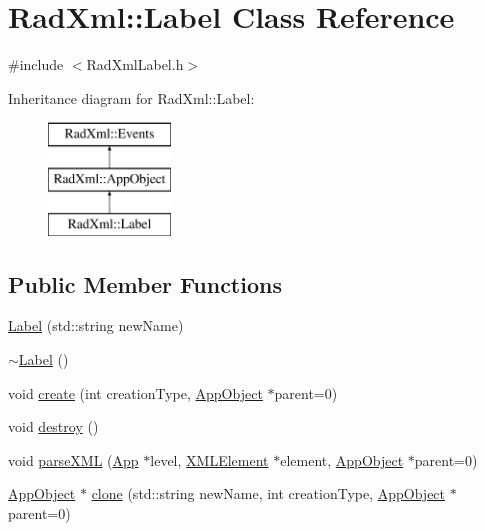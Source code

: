 \hypertarget{class_rad_xml_1_1_label}{\section{Rad\-Xml\-:\-:Label Class Reference}
\label{class_rad_xml_1_1_label}
}


{\ttfamily \#include $<$Rad\-Xml\-Label.\-h$>$}

Inheritance diagram for Rad\-Xml\-:\-:Label\-:\begin{figure}[H]
\begin{center}
\leavevmode
\includegraphics[height=3.000000cm]{class_rad_xml_1_1_label}
\end{center}
\end{figure}
\subsection*{Public Member Functions}
\begin{DoxyCompactItemize}
\item 
\hyperlink{class_rad_xml_1_1_label_a0a0cf0ef464a6b1089714e2ff40819d3}{Label} (std\-::string new\-Name)
\item 
\hyperlink{class_rad_xml_1_1_label_a7fffe35f7affdd1d7d9d77be0ca016fc}{$\sim$\-Label} ()
\item 
void \hyperlink{class_rad_xml_1_1_label_a8859aa4061b768cd27289e4f7944e837}{create} (int creation\-Type, \hyperlink{class_rad_xml_1_1_app_object}{App\-Object} $\ast$parent=0)
\item 
void \hyperlink{class_rad_xml_1_1_label_a266bccd5c2074403df1d8996164e4943}{destroy} ()
\item 
void \hyperlink{class_rad_xml_1_1_label_a5d1dd126d49b3eb19177490a08241768}{parse\-X\-M\-L} (\hyperlink{class_rad_xml_1_1_app}{App} $\ast$level, \hyperlink{class_x_m_l_element}{X\-M\-L\-Element} $\ast$element, \hyperlink{class_rad_xml_1_1_app_object}{App\-Object} $\ast$parent=0)
\item 
\hyperlink{class_rad_xml_1_1_app_object}{App\-Object} $\ast$ \hyperlink{class_rad_xml_1_1_label_ad73594df3dfc1412f0d51a00534322a1}{clone} (std\-::string new\-Name, int creation\-Type, \hyperlink{class_rad_xml_1_1_app_object}{App\-Object} $\ast$parent=0)
\end{DoxyCompactItemize}

